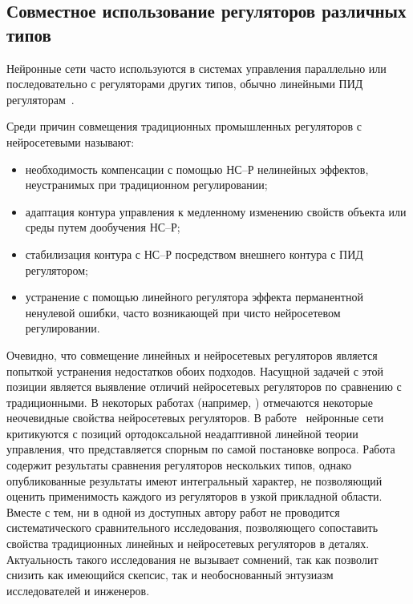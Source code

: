 
\subsection{Совместное использование регуляторов различных типов}

Нейронные сети часто используются в системах управления параллельно
или последовательно с регуляторами других типов, обычно линейными ПИД
регуляторам~\cite{steck96,sigom00,chenmills97}.

Среди причин совмещения традиционных промышленных регуляторов с
нейросетевыми называют:

\begin{itemize}

\item
необходимость компенсации с помощью НС--Р нелинейных эффектов,
неустранимых при традиционном регулировании;

\item
адаптация контура управления к медленному изменению свойств объекта
или среды путем дообучения НС--Р;

\item
стабилизация контура с НС--Р посредством внешнего контура с ПИД
регулятором;

\item
устранение с помощью линейного регулятора эффекта перманентной
ненулевой ошибки, часто возникающей при чисто нейросетевом
регулировании.

\end{itemize}

Очевидно, что совмещение линейных и нейросетевых регуляторов является
попыткой устранения недостатков обоих подходов.  Насущной задачей с
этой позиции является выявление отличий нейросетевых регуляторов по
сравнению с традиционными.  В некоторых работах (например,
\cite{chenmills97}) отмечаются некоторые неочевидные свойства
нейросетевых регуляторов.  В работе~\cite{warwick96} нейронные сети
критикуются с позиций ортодоксальной неадаптивной линейной теории
управления, что представляется спорным по самой постановке вопроса.
Работа~\cite{khomyu96} содержит результаты сравнения регуляторов
нескольких типов, однако опубликованные результаты имеют интегральный
характер, не позволяющий оценить применимость каждого из регуляторов в
узкой прикладной области.  Вместе с тем, ни в одной из доступных
автору работ не проводится систематического сравнительного
исследования, позволяющего сопоставить свойства традиционных линейных
и нейросетевых регуляторов в деталях.  Актуальность такого
исследования не вызывает сомнений, так как позволит снизить как
имеющийся скепсис, так и необоснованный энтузиазм исследователей и
инженеров.

